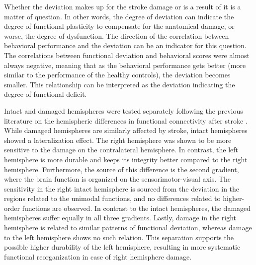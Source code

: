 \documentclass[fleqn,10pt]{wlscirep}
\begin{document}
Whether the deviation makes up for the stroke damage or is a result of it is a matter of question. In other words, the degree of deviation can indicate the degree of functional plasticity to compensate for the anatomical damage, or worse, the degree of dysfunction. The direction of the correlation between behavioral performance and the deviation can be an indicator for this question. The correlations between functional deviation and behavioral scores were almost always negative, meaning that as the behavioral performance gets better (more similar to the performance of the healthy controls), the deviation becomes smaller. This relationship can be interpreted as the deviation indicating the degree of functional deficit. 

Intact and damaged hemispheres were tested separately following the previous literature on the hemispheric differences in functional connectivity after stroke \citep{new2015altered,yourganov2021effect, tang2016decreased, urbin2014resting}. While damaged hemispheres are similarly affected by stroke, intact hemispheres showed a lateralization effect. The right hemisphere was shown to be more sensitive to the damage on the contralateral hemisphere. In contrast, the left hemisphere is more durable and keeps its integrity better compared to the right hemisphere. Furthermore, the source of this difference is the second gradient, where the brain function is organized on the sensorimotor-visual axis. The sensitivity in the right intact hemisphere is sourced from the deviation in the regions related to the unimodal functions, and no differences related to higher-order functions are observed. In contrast to the intact hemispheres, the damaged hemispheres suffer equally in all three gradients. Lastly, damage in the right hemisphere is related to similar patterns of functional deviation, whereas damage to the left hemisphere shows no such relation. This separation supports the possible higher durability of the left hemisphere, resulting in more systematic functional reorganization in case of right hemisphere damage.
\end{document}

